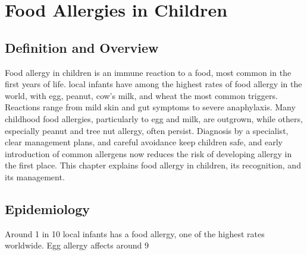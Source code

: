 \chapter{Food Allergies in Children}

\section*{Definition and Overview}
Food allergy in children is an immune reaction to a food, most common in the first years of life. local infants have among the highest rates of food allergy in the world, with egg, peanut, cow's milk, and wheat the most common triggers. Reactions range from mild skin and gut symptoms to severe anaphylaxis. Many childhood food allergies, particularly to egg and milk, are outgrown, while others, especially peanut and tree nut allergy, often persist. Diagnosis by a specialist, clear management plans, and careful avoidance keep children safe, and early introduction of common allergens now reduces the risk of developing allergy in the first place. This chapter explains food allergy in children, its recognition, and its management.

\section*{Epidemiology}
Around 1 in 10 local infants has a food allergy, one of the highest rates worldwide. Egg allergy affects around 9%

